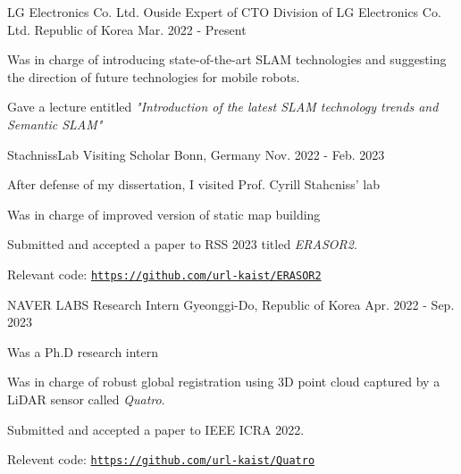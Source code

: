 

\begin{cventries}

  \cventry
    {LG Electronics Co. Ltd.} %
    {Ouside Expert of CTO Division of LG Electronics Co. Ltd.} %
    {Republic of Korea} %
    {Mar. 2022 - Present} %
    {
      \begin{cvitems} %
        \item Was in charge of introducing state-of-the-art SLAM technologies and suggesting the direction of future technologies for mobile robots.
        \item Gave a lecture entitled \textit{"Introduction of the latest SLAM technology trends and Semantic SLAM"}
      \end{cvitems}
    }

  \cventry
    {StachnissLab} %
    {Visiting Scholar} %
    {Bonn, Germany} %
    {Nov. 2022 - Feb. 2023} %
    {
      \begin{cvitems} %
        \item After defense of my dissertation, I visited Prof. Cyrill Stahcniss' lab
        \item Was in charge of improved version of static map building
        \item Submitted and accepted a paper to RSS 2023 titled \textit{ERASOR2}.
        \item Relevant code: \href{https://github.com/url-kaist/ERASOR2}{\texttt{https://github.com/url-kaist/ERASOR2}}
      \end{cvitems}
    }

  \cventry
    {NAVER LABS} %
    {Research Intern} %
    {Gyeonggi-Do, Republic of Korea} %
    {Apr. 2022 - Sep. 2023} %
    {
      \begin{cvitems} %
        \item Was a Ph.D research intern
        \item Was in charge of robust global registration using 3D point cloud captured by a LiDAR sensor called \textit{Quatro}.
        \item Submitted and accepted a paper to IEEE ICRA 2022.
        \item Relevent code: \href{https://github.com/url-kaist/Quatro}{\texttt{https://github.com/url-kaist/Quatro}}
      \end{cvitems}
    }
\end{cventries}
